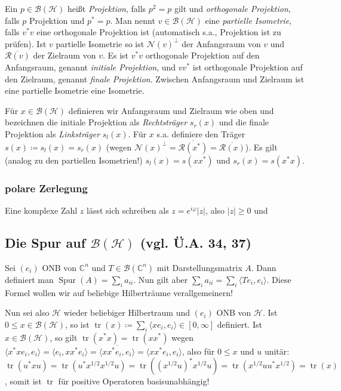 \documentclass[11pt,a4paper]{scrartcl}
\newcommand{\C}{\mathbb{C}} %
\newcommand{\Hc}{\mathcal{H}}
\newcommand{\B}{\mathcal{B}}
\newcommand{\Nc}{\mathcal{N}}
\newcommand{\Rc}{\mathcal{R}}
\theoremstyle{plain}
\theoremstyle{definition}
\theoremstyle{remark}
\DeclareMathOperator{\Spur}{Spur}
\DeclareMathOperator{\tr}{tr}
\begin{document}
Ein $p\in \B(\Hc)$ heißt \emph{Projektion}, falls $p^2=p$ gilt und \emph{orthogonale Projektion}, falls $p$ Projektion und $p^*=p$. Man nennt $v\in \B(\Hc)$ eine \emph{partielle Isometrie}, falls $v^*v$ eine orthogonale Projektion ist (automatisch s.a., Projektion ist zu prüfen). Ist $v$ partielle Isometrie so ist $\Nc(v)^\perp$ der Anfangsraum von $v$ und $\overline{\Rc(v)}$ der Zielraum von $v$. Es ist $v^*v$ orthogonale Projektion auf den Anfangsraum, genannt \emph{initiale Projektion}, und $vv^*$ ist orthogonale Projektion auf den Zielraum, genannt \emph{finale Projektion}. Zwischen Anfangsraum und Zielraum ist eine partielle Isometrie eine Isometrie.

Für $x\in \B(\Hc)$ definieren wir Anfangsraum und Zielraum wie oben und bezeichnen die initiale Projektion als \emph{Rechtsträger} $s_r(x)$ und die finale Projektion als \emph{Linksträger} $s_l(x)$. Für $x$ s.a. definiere den Träger $s(x)\coloneqq s_l(x)=s_r(x)$ (wegen $\Nc(x)^\perp=\overline{\Rc(x^*)}=\overline{\Rc(x)}$). Es gilt (analog zu den partiellen Isometrien!) $s_l(x)=s(xx^*)$ und $s_r(x)=s(x^*x)$.

\subsubsection{polare Zerlegung}

Eine komplexe Zahl $z$ lässt sich schreiben als $z=e^{i\varphi}|z|$, also $|z| \geq 0$ und


\subsection{Die Spur auf $\B(\Hc)$ (vgl. Ü.A. 34, 37)}

Sei $(e_i)$ ONB von $\C^n$ und $T\in \B(\C^n)$ mit Darstellungsmatrix $A$. Dann definiert man $\Spur(A)=\sum_i a_{ii}$. Nun gilt aber $\sum_i a_{ii} = \sum_i \langle Te_i, e_i \rangle$. Diese Formel wollen wir auf beliebige Hilberträume verallgemeinern!

Nun sei also $\Hc$ wieder beliebiger Hilbertraum und $(e_i)$ ONB von $\Hc$. Ist $0\leq x\in \B(\Hc)$, so ist $\tr(x)\coloneqq \sum_i \langle x e_i, e_i \rangle \in [0,\infty]$ definiert. Ist $x\in \B(\Hc)$, so gilt $\tr(x^*x)=\tr(xx^*)$ wegen $\langle x^*x e_i, e_i \rangle = \langle e_i, xx^* e_i \rangle = \overline{\langle xx^* e_i, e_i \rangle} = \langle xx^* e_i, e_i \rangle$, also für $0 \leq x$ und $u$ unitär: $\tr(u^*xu)=\tr(u^*x^{1/2}x^{1/2}u)=\tr((x^{1/2}u)^*x^{1/2}u)=\tr(x^{1/2}uu^*x^{1/2})=\tr(x)$, somit ist $\tr$ für positive Operatoren basisunabhängig!
\end{document}
